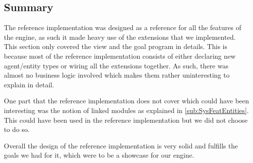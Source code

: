 \subsection*{Summary}

The reference implementation was designed as a reference for all the
features of the engine, as such it made heavy use of the extensions
that we implemented. This section only covered the view and the goal
program in details. This is because most of the reference implementation
consists of either declaring new agent/entity types or wiring all
the extensions together. As such, there was almost no business logic
involved which makes them rather uninteresting to explain in detail.

One part that the reference implementation does not cover which could
have been interesting was the notion of linked modules as explained
in \ref{sub:SysFeatEntities}. This could have been used in the reference
implementation but we did not choose to do so.

Overall the design of the reference implementation is very solid and
fulfills the goals we had for it, which were to be a showcase for
our engine.
